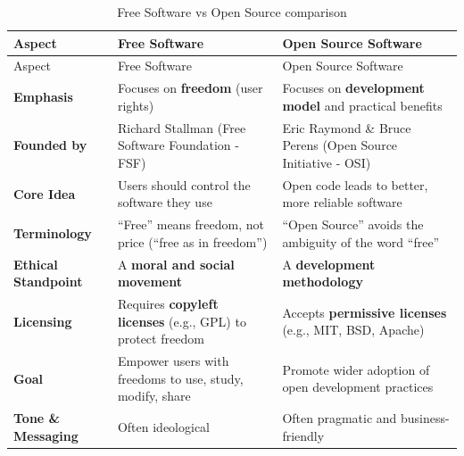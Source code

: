 \documentclass[
  11pt,
  letterpaper,
]{book}
\begin{document}
\begin{longtable}[]{@{}
  >{\raggedright\arraybackslash}p{}
  >{\raggedright\arraybackslash}p{}
  >{\raggedright\arraybackslash}p{}@{}}
\caption{Free Software vs Open Source
comparison}\label{tbl-comparison}\tabularnewline
\toprule\noalign{}
\begin{minipage}[b]{\linewidth}\raggedright
Aspect
\end{minipage} & \begin{minipage}[b]{\linewidth}\raggedright
Free Software
\end{minipage} & \begin{minipage}[b]{\linewidth}\raggedright
Open Source Software
\end{minipage} \\
\midrule\noalign{}
\endfirsthead
\toprule\noalign{}
\begin{minipage}[b]{\linewidth}\raggedright
Aspect
\end{minipage} & \begin{minipage}[b]{\linewidth}\raggedright
Free Software
\end{minipage} & \begin{minipage}[b]{\linewidth}\raggedright
Open Source Software
\end{minipage} \\
\midrule\noalign{}
\endhead
\bottomrule\noalign{}
\endlastfoot
\textbf{Emphasis} & Focuses on \textbf{freedom} (user rights) & Focuses
on \textbf{development model} and practical benefits \\
\textbf{Founded by} & Richard Stallman (Free Software Foundation - FSF)
& Eric Raymond \& Bruce Perens (Open Source Initiative - OSI) \\
\textbf{Core Idea} & Users should control the software they use & Open
code leads to better, more reliable software \\
\textbf{Terminology} & ``Free'' means freedom, not price (``free as in
freedom'') & ``Open Source'' avoids the ambiguity of the word
``free'' \\
\textbf{Ethical Standpoint} & A \textbf{moral and social movement} & A
\textbf{development methodology} \\
\textbf{Licensing} & Requires \textbf{copyleft licenses} (e.g., GPL) to
protect freedom & Accepts \textbf{permissive licenses} (e.g., MIT, BSD,
Apache) \\
\textbf{Goal} & Empower users with freedoms to use, study, modify, share
& Promote wider adoption of open development practices \\
\textbf{Tone \& Messaging} & Often ideological & Often pragmatic and
business-friendly \\
\end{longtable}
\end{document}
